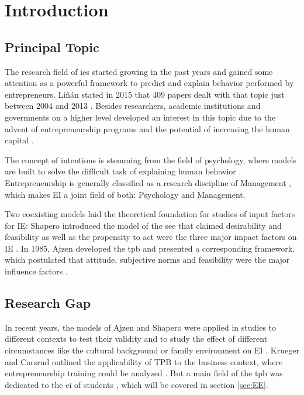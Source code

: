 \chapter{Introduction}\label{chapter:Introduction}

\renewcommand{\thepage}{\arabic{page}}
\setcounter{page}{1}

\section{Principal Topic}
The research field of  \acp{ie}
started  growing in the past years and gained some attention as a powerful framework to predict and explain behavior performed by entrepreneurs. Li{\~n}{\'a}n stated in 2015 that 409 papers dealt with that topic just between 2004 and 2013 \cite{linan2015systematic}.
Besides researchers, academic institutions and governments on a higher level developed an interest in this topic due to the advent of entrepreneurship programs and the potential of increasing the human capital \cite{fayolle2015impact,martin2013examining}.

The concept of intentions is stemming from the field of psychology, where models are built to solve the difficult task of explaining human behavior \cite{ajzen1991theory}. Entrepreneurship is generally classified as a research discipline of Management \cite{shane2000promise}, which makes EI a joint field of both: Psychology and Management. 


Two coexisting  models laid the theoretical foundation for studies of input factors for IE: Shapero introduced the model of the \ac{see} that claimed desirability and feasibility as well as the propensity to act were the three major impact factors on IE \cite{shapero1982social,shapero1984entrepreneurial}. In 1985, Ajzen developed the \ac{tpb} and presented a corresponding  framework, which postulated that attitude, subjective norms and feasibility were the major influence factors \cite{ajzen1985intentions}.

\section{Research Gap}
In recent years, the models of Ajzen and Shapero were applied in  studies to different contexts to test their validity and to study the effect of different circumstances like the cultural background or family environment on EI \cite{laspita2012intergenerational, linan2009development,hayton2002national,mueller2001culture}. 
Krueger and Carsrud outlined the applicability of TPB to the business context, where entrepreneurship training could be analyzed \cite{krueger1993entrepreneurial}. 
But a main field of the \ac{tpb} was dedicated to the \ac{ei} of students \cite{fayolle2015impact}, which will be covered in section \ref{sec:EE}.

